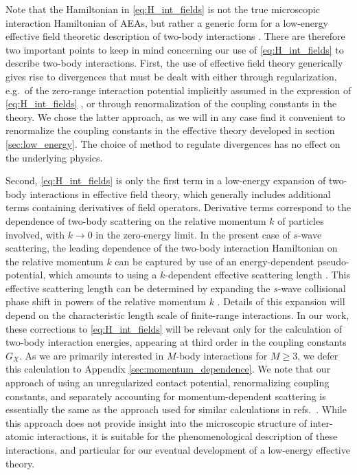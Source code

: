 \documentclass[preprint,showkeys,nofootinbib]{revtex4-1}
\newcommand{\1}{\mathds{1}}
\begin{document}
Note that the Hamiltonian in \eqref{eq:H_int_fields} is not the true
microscopic interaction Hamiltonian of AEAs, but rather a generic form
for a low-energy effective field theoretic description of two-body
interactions \cite{scazza2014observation, cazalilla2009ultracold,
  johnson2012effective, yin2014universal, johnson2009effective,
  gorshkov2010twoorbital, wall2013strongly, busch1998two}.  There are
therefore two important points to keep in mind concerning our use of
\eqref{eq:H_int_fields} to describe two-body interactions.  First, the
use of effective field theory generically gives rise to divergences
that must be dealt with either through regularization, e.g.~of the
zero-range interaction potential implicitly assumed in the expression
of \eqref{eq:H_int_fields} \cite{giorgini2008theory}, or through
renormalization of the coupling constants in the theory.  We chose the
latter approach, as we will in any case find it convenient to
renormalize the coupling constants in the effective theory developed
in section \ref{sec:low_energy}.  The choice of method to regulate
divergences has no effect on the underlying physics.

Second, \eqref{eq:H_int_fields} is only the first term in a low-energy
expansion of two-body interactions in effective field theory, which
generally includes additional terms containing derivatives of field
operators.  Derivative terms correspond to the dependence of two-body
scattering on the relative momentum $k$ of particles involved, with
$k\to0$ in the zero-energy limit.  In the present case of $s$-wave
scattering, the leading dependence of the two-body interaction
Hamiltonian on the relative momentum $k$ can be captured by use of an
energy-dependent pseudo-potential, which amounts to using a
$k$-dependent effective scattering length \cite{blume2002fermi}.  This
effective scattering length can be determined by expanding the
$s$-wave collisional phase shift in powers of the relative momentum
$k$ \cite{giorgini2008theory, flambaum1999analytical}.  Details of
this expansion will depend on the characteristic length scale of
finite-range interactions.  In our work, these corrections to
\eqref{eq:H_int_fields} will be relevant only for the calculation of
two-body interaction energies, appearing at third order in the
coupling constants $G_X$.  As we are primarily interested in $M$-body
interactions for $M\ge3$, we defer this calculation to Appendix
\ref{sec:momentum_dependence}.  We note that our approach of using an
unregularized contact potential, renormalizing coupling constants, and
separately accounting for momentum-dependent scattering is essentially
the same as the approach used for similar calculations in
refs.~\cite{johnson2012effective, yin2014universal,
  johnson2009effective}.  While this approach does not provide insight
into the microscopic structure of inter-atomic interactions, it is
suitable for the phenomenological description of these interactions,
and particular for our eventual development of a low-energy effective
theory.
\end{document}
